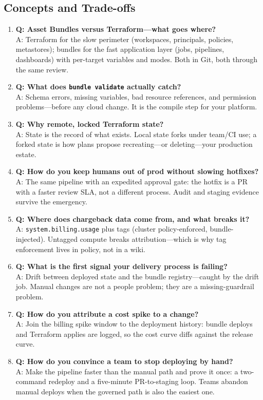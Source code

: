 \subsection{Concepts and Trade-offs}
\begin{enumerate}
    \item \textbf{Q: Asset Bundles versus Terraform---what goes where?}\\
    A: Terraform for the slow perimeter (workspaces, principals, policies, metastores); bundles for the fast application layer (jobs, pipelines, dashboards) with per-target variables and modes. Both in Git, both through the same review.
    \item \textbf{Q: What does \texttt{bundle validate} actually catch?}\\
    A: Schema errors, missing variables, bad resource references, and permission problems---before any cloud change. It is the compile step for your platform.
    \item \textbf{Q: Why remote, locked Terraform state?}\\
    A: State is the record of what exists. Local state forks under team/CI use; a forked state is how plans propose recreating---or deleting---your production estate.
    \item \textbf{Q: How do you keep humans out of prod without slowing hotfixes?}\\
    A: The same pipeline with an expedited approval gate: the hotfix is a PR with a faster review SLA, not a different process. Audit and staging evidence survive the emergency.
    \item \textbf{Q: Where does chargeback data come from, and what breaks it?}\\
    A: \texttt{system.billing.usage} plus tags (cluster policy-enforced, bundle-injected). Untagged compute breaks attribution---which is why tag enforcement lives in policy, not in a wiki.
    \item \textbf{Q: What is the first signal your delivery process is failing?}\\
    A: Drift between deployed state and the bundle registry---caught by the drift job. Manual changes are not a people problem; they are a missing-guardrail problem.
    \item \textbf{Q: How do you attribute a cost spike to a change?}\\
    A: Join the billing spike window to the deployment history: bundle deploys and Terraform applies are logged, so the cost curve diffs against the release curve.
    \item \textbf{Q: How do you convince a team to stop deploying by hand?}\\
    A: Make the pipeline faster than the manual path and prove it once: a two-command redeploy and a five-minute PR-to-staging loop. Teams abandon manual deploys when the governed path is also the easiest one.
\end{enumerate}

